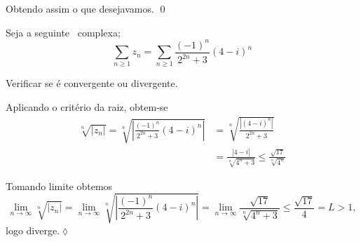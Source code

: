Obtendo assim o que desejavamos. \qed

\begin{exer}
Seja a seguinte \ser\ complexa;
\begin{equation*}
\sum_{n\geq 1}z_n=\sum_{n\geq 1}\frac{(-1)^n}{2^{2n}+3}(4-i)^n
\end{equation*}
\end{exer}
Verificar se \'e convergente ou divergente.

\solo Aplicando o critério da raiz, obtem-se
\begin{align*}
 \sqrt[n]{|z_{n}|}= \sqrt[n]{\left|\frac{(-1)^n}{2^{2n}+3}(4-i)^n
  \right|}&=\sqrt[n]{\frac{|(4-i)^n|}{2^{2n}+3}}\\[2ex]
  &=\frac{|4-i|}{\sqrt[n]{4^n+3}} \leq \frac{\sqrt{17}}{\sqrt[n]{4^n}}
\end{align*}

Tomando limite obtemos
\begin{equation*}
 \lim_{n\to \infty}\sqrt[n]{|z_{n}|}=\lim_{n\to\infty}\sqrt[n]{\left|\frac{(-1)^n}{2^{2n}+3}(4-i)^n
  \right|}= \lim_{n\to\infty}\frac{\sqrt{17}}{\sqrt[n]{4^n+3}}\leq\frac{\sqrt{17}}{4}=L>1,
\end{equation*}
logo  diverge.\hfill \(\lozenge\)


